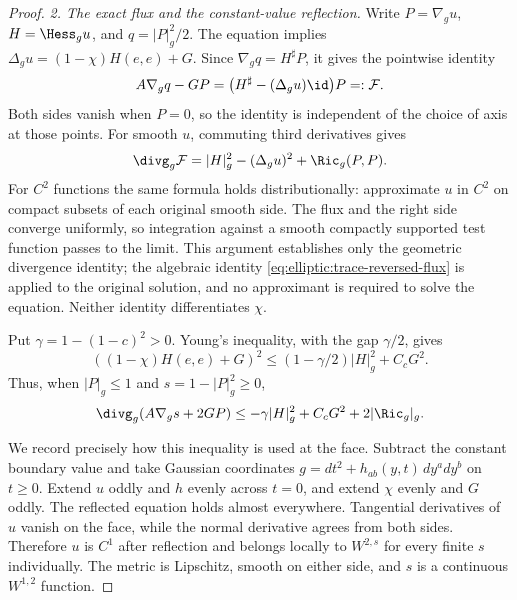 \begin{proof}
\medskip\noindent
\emph{2. The exact flux and the constant-value reflection.}
Write $P=\nabla_g u$, $H=\Hess_g u$, and $q=|P|_g^2/2$.  The equation
implies
$\Delta_g u=(1-\chi)H(e,e)+G$.  Since
$\nabla_g q=H^\sharp P$, it gives the pointwise identity
\begin{equation}
 A\nabla_g q-GP
      =\bigl(H^\sharp-(\Delta_g u)\id\bigr)P=:\mathcal F.
 \label{eq:elliptic:trace-reversed-flux}
\end{equation}
Both sides vanish when $P=0$, so the identity is independent of the
choice of axis at those points.  For smooth $u$, commuting third derivatives gives
\begin{equation}
 \divg_g\mathcal F
     =|H|_g^2-(\Delta_g u)^2+\Ric_g(P,P).
\label{eq:elliptic:trace-reversed-divergence}
\end{equation}
For $C^2$ functions the same formula holds distributionally: approximate
$u$ in $C^2$ on compact subsets of each original smooth side.  The flux
and the right side converge uniformly, so integration against a smooth
compactly supported test function passes to the limit.  This argument
establishes only the geometric divergence identity; the algebraic identity
\eqref{eq:elliptic:trace-reversed-flux} is applied to the original
solution, and no approximant is required to solve the equation.
Neither identity differentiates $\chi$.

Put $\gamma=1-(1-c)^2>0$.  Young's inequality, with the gap $\gamma/2$,
gives
\[
 ((1-\chi)H(e,e)+G)^2
     \leq(1-\gamma/2)|H|_g^2+C_cG^2.
\]
Thus, when $|P|_g\leq1$ and $s=1-|P|_g^2\geq0$,
\begin{equation}
 \divg_g(A\nabla_g s+2GP)
       \leq-\gamma|H|_g^2+C_cG^2+2|\Ric_g|_g.
 \label{eq:elliptic:gradient-deficit}
\end{equation}

We record precisely how this inequality is used at the face.  Subtract
the constant boundary value and take Gaussian coordinates
$g=dt^2+h_{ab}(y,t)\,dy^a dy^b$ on $t\geq0$.  Extend $u$ oddly and
$h$ evenly across $t=0$, and extend $\chi$ evenly and $G$ oddly.
The reflected equation holds almost everywhere.  Tangential derivatives
of $u$ vanish on the face, while the normal derivative agrees from both
sides.  Therefore $u$ is $C^1$ after reflection and belongs locally to
$W^{2,s}$ for every finite $s$ individually.  The metric is Lipschitz,
smooth on either side, and $s$ is a continuous $W^{1,2}$ function.


\end{proof}
